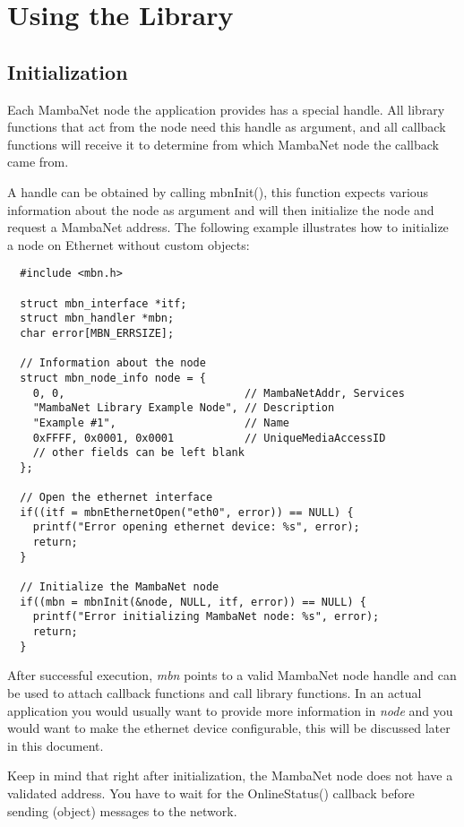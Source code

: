\chapter{Using the Library}
\section{Initialization}
Each MambaNet node the application provides has a special handle. All library functions that act from the node need this handle as argument, and all callback functions will receive it to determine from which MambaNet node the callback came from.

A handle can be obtained by calling mbnInit(), this function expects various information about the node as argument and will then initialize the node and request a MambaNet address. The following example illustrates how to initialize a node on Ethernet without custom objects:
\begin{verbatim}
  #include <mbn.h>

  struct mbn_interface *itf;
  struct mbn_handler *mbn;
  char error[MBN_ERRSIZE];

  // Information about the node
  struct mbn_node_info node = {
    0, 0,                            // MambaNetAddr, Services
    "MambaNet Library Example Node", // Description
    "Example #1",                    // Name
    0xFFFF, 0x0001, 0x0001           // UniqueMediaAccessID
    // other fields can be left blank
  };

  // Open the ethernet interface
  if((itf = mbnEthernetOpen("eth0", error)) == NULL) {
    printf("Error opening ethernet device: %s", error);
    return;
  }

  // Initialize the MambaNet node
  if((mbn = mbnInit(&node, NULL, itf, error)) == NULL) {
    printf("Error initializing MambaNet node: %s", error);
    return;
  }
\end{verbatim}

After successful execution, \textit{mbn} points to a valid MambaNet node handle and can be used to attach callback functions and call library functions. In an actual application you would usually want to provide more information in \textit{node} and you would want to make the ethernet device configurable, this will be discussed later in this document.

Keep in mind that right after initialization, the MambaNet node does not have a validated address. You have to wait for the OnlineStatus() callback before sending (object) messages to the network.

